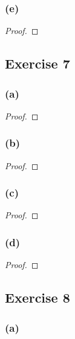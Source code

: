 \documentclass[14pt]{extarticle}
\begin{document}
\subsubsection{(e)}

\begin{proof}

\end{proof}

\subsection{Exercise 7}

\subsubsection{(a)}

\begin{proof}

\end{proof}

\subsubsection{(b)}

\begin{proof}

\end{proof}

\subsubsection{(c)}

\begin{proof}

\end{proof}

\subsubsection{(d)}

\begin{proof}

\end{proof}

\subsection{Exercise 8}

\subsubsection{(a)}
\end{document}
